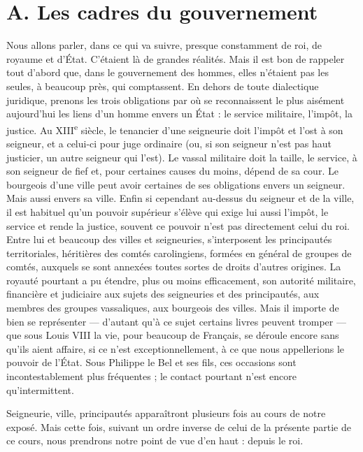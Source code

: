 \documentclass[french,twoside]{book} %
\begin{document}
\section[A. Les cadres du gouvernement]{A. Les cadres du gouvernement}
\label{c03a}
\noindent  {}
\label{p11} Nous allons parler, dans ce qui va suivre, presque constamment de roi, de royaume et d’État. C’étaient là de grandes réalités. Mais il est bon de rappeler tout d’abord que, dans le gouvernement des hommes, elles n’étaient pas les seules, à beaucoup près, qui comptassent. En dehors de toute dialectique juridique, prenons les trois obligations par où se reconnaissent le plus aisément aujourd’hui les liens d’un homme envers un État : le service militaire, l’impôt, la justice. Au XIII\textsuperscript{e} siècle, le tenancier d’une seigneurie doit l’impôt et l’ost à son seigneur, et a celui-ci pour juge ordinaire (ou, si son seigneur n’est pas haut justicier, un autre seigneur qui l’est). Le vassal militaire doit la taille, le service, à son seigneur de fief et, pour certaines causes du moins, dépend de sa cour. Le bourgeois d’une ville peut avoir certaines de ses obligations envers un seigneur. Mais aussi envers sa ville. Enfin si cependant au-dessus du seigneur et de la ville, il est habituel qu’un pouvoir supérieur s’élève qui exige lui aussi l’impôt, le service et rende la justice, souvent ce pouvoir n’est pas directement celui du roi. Entre lui et beaucoup des villes et seigneuries, s’interposent les principautés territoriales, héritières des comtés carolingiens, formées en général de groupes de comtés,  
\label{p12} auxquels se sont annexées toutes sortes de droits d’autres origines. La royauté pourtant a pu étendre, plus ou moins efficacement, son autorité militaire, financière et judiciaire aux sujets des seigneuries et des principautés, aux membres des groupes vassaliques, aux bourgeois des villes. Mais il importe de bien se représenter — d’autant qu’à ce sujet certains livres peuvent tromper — que sous Louis VIII la vie, pour beaucoup de Français, se déroule encore sans qu’ils aient affaire, si ce n’est exceptionnellement, à ce que nous appellerions le pouvoir de l’État. Sous Philippe le Bel et ses fils, ces occasions sont incontestablement plus fréquentes ; le contact pourtant n’est encore qu’intermittent.\par
Seigneurie, ville, principautés apparaîtront plusieurs fois au cours de notre exposé. Mais cette fois, suivant un ordre inverse de celui de la présente partie de ce cours, nous prendrons notre point de vue d’en haut : depuis le roi.
\end{document}
